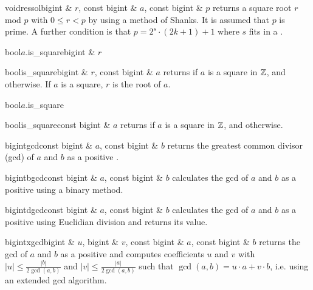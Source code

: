 \begin{fcode}{void}{ressol}{bigint & $r$, const bigint & $a$, const bigint & $p$}
  returns a square root $r$ mod $p$ with $0 \leq r < p$ by using a method of Shanks.  It is
  assumed that $p$ is prime.
  A further condition is that $p = 2^s \cdot (2k+1) + 1$ where $s$ fits in a .
\end{fcode}

\begin{cfcode}{bool}{$a$.is_square}{bigint & $r$}\end{cfcode}
\begin{fcode}{bool}{is_square}{bigint & $r$, const bigint & $a$}
  returns \TRUE if $a$ is a square in $\mathbb{Z}$, and \FALSE otherwise.  If $a$ is a square, $r$ is
  the root of $a$.
\end{fcode}

\begin{cfcode}{bool}{$a$.is_square}{}\end{cfcode}
\begin{fcode}{bool}{is_square}{const bigint & $a$}
  returns \TRUE if $a$ is a square in $\mathbb{Z}$, and \FALSE otherwise.
\end{fcode}




\begin{fcode}{bigint}{gcd}{const bigint & $a$, const bigint & $b$}
  returns the greatest common divisor (gcd) of $a$ and $b$ as a positive .
\end{fcode}

\begin{fcode}{bigint}{bgcd}{const bigint & $a$, const bigint & $b$}
  calculates the gcd of $a$ and $b$ as a positive  using a binary method.
\end{fcode}

\begin{fcode}{bigint}{dgcd}{const bigint & $a$, const bigint & $b$}
  calculates the gcd of $a$ and $b$ as a positive  using Euclidian division and
  returns its value.
\end{fcode}

\begin{fcode}{bigint}{xgcd}{bigint & $u$, bigint & $v$, const bigint & $a$, const bigint & $b$}
  returns the gcd of $a$ and $b$ as a positive  and computes coefficients $u$ and
  $v$ with $|u| \leq \frac{|b|}{2 \gcd(a, b)}$ and $|v| \leq \frac{|a|}{2 \gcd(a,b)}$ such that
  $\gcd(a, b) = u \cdot a + v \cdot b$, i.e.  using an extended gcd algorithm.
\end{fcode}

